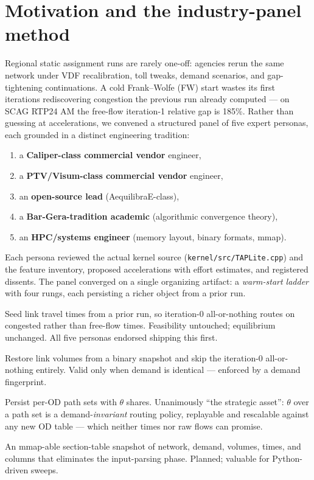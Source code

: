 \documentclass[10pt]{article}
\newcommand{\code}[1]{\texttt{#1}}
\begin{document}
\section{Motivation and the industry-panel method}

Regional static assignment runs are rarely one-off: agencies rerun the same
network under VDF recalibration, toll tweaks, demand scenarios, and
gap-tightening continuations. A cold Frank--Wolfe (FW) start wastes its first
iterations rediscovering congestion the previous run already computed --- on
SCAG RTP24 AM the free-flow iteration-1 relative gap is 185\%. Rather than
guessing at accelerations, we convened a structured panel of five expert
personas, each grounded in a distinct engineering tradition:

\begin{enumerate}[nosep]
  \item a \textbf{Caliper-class commercial vendor} engineer,
  \item a \textbf{PTV/Visum-class commercial vendor} engineer,
  \item an \textbf{open-source lead} (AequilibraE-class),
  \item a \textbf{Bar-Gera-tradition academic} (algorithmic convergence theory),
  \item an \textbf{HPC/systems engineer} (memory layout, binary formats, mmap).
\end{enumerate}

Each persona reviewed the actual kernel source (\code{kernel/src/TAPLite.cpp})
and the feature inventory, proposed accelerations with effort estimates, and
registered dissents. The panel converged on a single organizing artifact: a
\emph{warm-start ladder} with four rungs, each persisting a richer object from a
prior run.

\begin{description}[nosep]
  \item[L1 --- Congested TIMES preload.] Seed link travel times from a prior
    run, so iteration-0 all-or-nothing routes on congested rather than
    free-flow times. Feasibility untouched; equilibrium unchanged. All five
    personas endorsed shipping this first.
  \item[L2 --- FLOWS restart.] Restore link volumes from a binary snapshot and
    skip the iteration-0 all-or-nothing entirely. Valid only when demand is
    identical --- enforced by a demand fingerprint.
  \item[L3 --- Binary COLUMN store.] Persist per-OD path sets with $\theta$
    shares. Unanimously ``the strategic asset'': $\theta$ over a path set is a
    demand-\emph{invariant} routing policy, replayable and rescalable against
    any new OD table --- which neither times nor raw flows can promise.
  \item[L4 --- Full binary state snapshot (DTST).] An mmap-able section-table
    snapshot of network, demand, volumes, times, and columns that eliminates
    the input-parsing phase. Planned; valuable for Python-driven sweeps.
\end{description}
\end{document}

